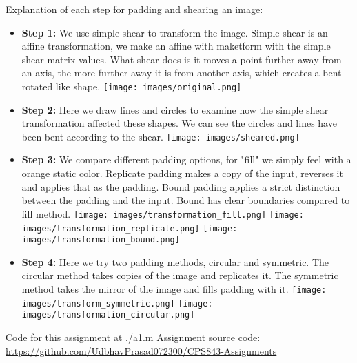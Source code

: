 \documentclass[conference]{IEEEtran}
\begin{document}
Explanation of each step for padding and shearing an image:
\begin{itemize}
  \item \textbf{Step 1:} We use simple shear to transform the image. Simple shear is an affine transformation, we make an affine with maketform with the simple shear matrix values. What shear does is it moves a point further away from an axis, the more further away it is from another axis, which creates a bent rotated like shape.
  \texttt{[image: images/original.png]}
  
  \item \textbf{Step 2:} Here we draw lines and circles to examine how the simple shear transformation affected these shapes. We can see the circles and lines have been bent according to the shear.
  \texttt{[image: images/sheared.png]}
  
  \item \textbf{Step 3:} We compare different padding options, for "fill" we simply feel with a orange static color. Replicate padding makes a copy of the input, reverses it and applies that as the padding. Bound padding applies a strict distinction between the padding and the input. Bound has clear boundaries compared to fill method.
  \texttt{[image: images/transformation\_fill.png]}
  \texttt{[image: images/transformation\_replicate.png]}
  \texttt{[image: images/transformation\_bound.png]}
  
  \item \textbf{Step 4:} Here we try two padding methods, circular and symmetric. The circular method takes copies of the image and replicates it. The symmetric method takes the mirror of the image and fills padding with it.
  \texttt{[image: images/transform\_symmetric.png]}
  \texttt{[image: images/transformation\_circular.png]}
  
\end{itemize}

\begin{thebibliography}{00}
 Code for this assignment at ./a1.m
 Assignment source code: \url{https://github.com/UdbhavPrasad072300/CPS843-Assignments}
\end{thebibliography}
\end{document}
